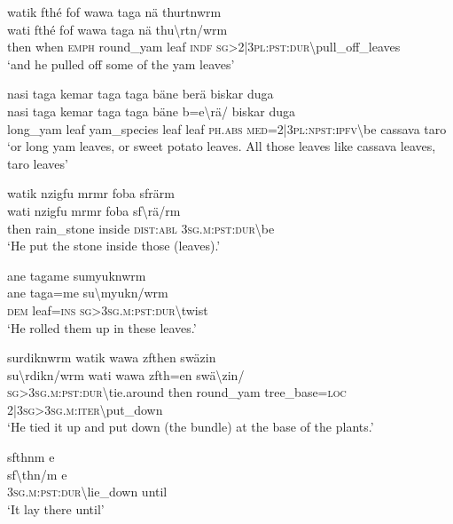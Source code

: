 \ea\label{ex:1:a3786}
watik fthé fof wawa taga nä thurtnwrm\\
\gll wati	fthé	fof	wawa	taga	nä	thu{\textbackslash}rtn/wrm\\
     then	when	\textsc{emph}	round\_yam	leaf	\textsc{indf}	\textsc{sg}>2|3\textsc{pl}:\textsc{pst}:\textsc{dur}{\textbackslash}pull\_off\_leaves\\
\glt `and he pulled off some of the yam leaves'
\z

\ea\label{ex:1:a3788}
nasi taga kemar taga taga bäne berä biskar duga\\
\gll nasi	taga	kemar	taga	taga	bäne	b=e{\textbackslash}rä/	biskar	duga\\
     long\_yam	leaf	yam\_species	leaf	leaf	\textsc{ph}.\textsc{abs}	\textsc{med}=2|3\textsc{pl}:\textsc{npst}:\textsc{ipfv}{\textbackslash}be	cassava	taro\\
\glt `or long yam leaves, or sweet potato leaves. All those leaves like cassava leaves, taro leaves'
\z

\ea\label{ex:1:a3791}
watik nzigfu mrmr foba sfrärm\\
\gll wati	nzigfu	mrmr	foba	sf{\textbackslash}rä/rm\\
     then	rain\_stone	inside	\textsc{dist}:\textsc{abl}	3\textsc{sg}.\textsc{m}:\textsc{pst}:\textsc{dur}{\textbackslash}be\\
\glt `He put the stone inside those (leaves).'
\z

\ea\label{ex:1:a3792}
ane tagame sumyuknwrm\\
\gll ane	taga=me	su{\textbackslash}myukn/wrm\\
     \textsc{dem}	leaf=\textsc{ins}	\textsc{sg}>3\textsc{sg}.\textsc{m}:\textsc{pst}:\textsc{dur}{\textbackslash}twist\\
\glt `He rolled them up in these leaves.'
\z

\ea\label{ex:1:a3793}
surdiknwrm watik wawa zfthen swäzin\\
\gll su{\textbackslash}rdikn/wrm	wati	wawa	zfth=en	swä{\textbackslash}zin/\\
     \textsc{sg}>3\textsc{sg}.\textsc{m}:\textsc{pst}:\textsc{dur}{\textbackslash}tie.around	then	round\_yam	tree\_base=\textsc{loc}	2|3\textsc{sg}>3\textsc{sg}.\textsc{m}:\textsc{iter}{\textbackslash}put\_down\\
\glt `He tied it up and put down (the bundle) at the base of the plants.'
\z

\ea\label{ex:1:a3794}
sfthnm e\\
\gll sf{\textbackslash}thn/m	e\\
     3\textsc{sg}.\textsc{m}:\textsc{pst}:\textsc{dur}{\textbackslash}lie\_down	until\\
\glt `It lay there until'
\z

